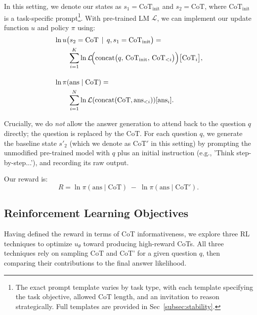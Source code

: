 \documentclass{article}
\theoremstyle{plain}
\theoremstyle{definition}
\theoremstyle{remark}
\begin{document}
In this setting, we denote our states as $s_1 = \text{CoT}_{\text{init}}$ and $s_2 = \text{CoT}$, where $\text{CoT}_{\text{init}}$ is a task-specific prompt\footnote{The exact prompt template varies by task type, with each template specifying the task objective, allowed $\text{CoT}$ length, and an invitation to reason strategically. Full templates are provided in Sec~\ref{subsec:stability}.}. With pre-trained LM $\mathcal{L}$, we can implement our update function $u$ and policy $\pi$ using:
\begin{align}
&\ln u\bigl(s_2 = \text{CoT} \,\mid\, q, s_1 = \text{CoT}_{\text{init}}\bigr) = \nonumber \\
& \qquad \sum_{i=1}^{K}
    \ln \mathcal{L}\!\Bigl(\text{concat}\bigl(q,\,
    \text{CoT}_{\text{init}},\, \text{CoT}_{<i}\bigr)\Bigr)\bigl[\text{CoT}_i\bigr], \\[1em]
&\ln \pi(\text{ans} \mid \text{CoT}) = \nonumber \\
& \qquad \sum_{i=1}^{N} \ln \mathcal{L}(\text{concat}(\text{CoT}, \text{ans}_{<i})) [\text{ans}_i].
\end{align}

Crucially, we do \emph{not} allow the answer generation to attend back to the question $q$ directly; the question is replaced by the $\text{CoT}$. For each question $q$, we generate the baseline state $s'_2$ (which we denote as $\text{CoT}'$ in this setting) by prompting the unmodified pre-trained model with $q$ plus an initial instruction (e.g., 'Think step-by-step...'), and recording its raw output.

Our reward is:
\[
R = \ln \pi(\text{ans} \mid \text{CoT}) \;-\; \ln \pi(\text{ans} \mid \text{CoT}').
\]

\subsection{Reinforcement Learning Objectives}
\label{subsec:rl_objectives}
Having defined the reward in terms of CoT informativeness, we explore three RL techniques to optimize $u_\theta$ toward producing high-reward CoTs. All three techniques rely on sampling $\text{CoT}$ and $\text{CoT'}$ for a given question $q$, then comparing their contributions to the final answer likelihood. 
\end{document}
